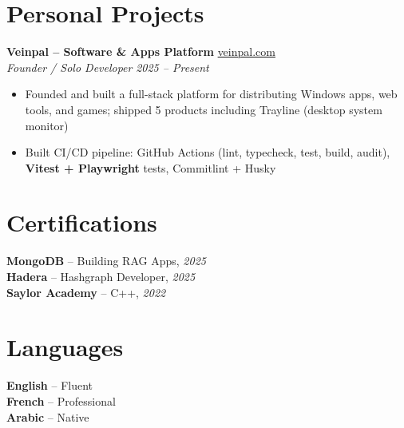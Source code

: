 \documentclass[10pt,a4paper]{article}
\begin{document}
\vspace{4pt}
\section*{Personal Projects}
{\small
\textbf{Veinpal -- Software \& Apps Platform} \hfill \href{https://veinpal.com}{veinpal.com}\\[1pt]
\textit{Founder / Solo Developer} \hfill \textit{2025 -- Present}
\begin{itemize}
  \item Founded and built a full-stack platform for distributing Windows apps, web tools, and games; shipped 5 products including Trayline (desktop system monitor)
  \item Built CI/CD pipeline: GitHub Actions (lint, typecheck, test, build, audit), \textbf{Vitest + Playwright} tests, Commitlint + Husky
\end{itemize}
}

\vspace{4pt}
\section*{Certifications}
{\small
\textbf{MongoDB} -- Building RAG Apps, \textit{2025}\\[1pt]
\textbf{Hadera} -- Hashgraph Developer, \textit{2025}\\[1pt]
\textbf{Saylor Academy} -- C++, \textit{2022}
}

\section*{Languages}
{\small
\textbf{English} -- Fluent\\[1pt]
\textbf{French} -- Professional\\[1pt]
\textbf{Arabic} -- Native
}
\end{document}
